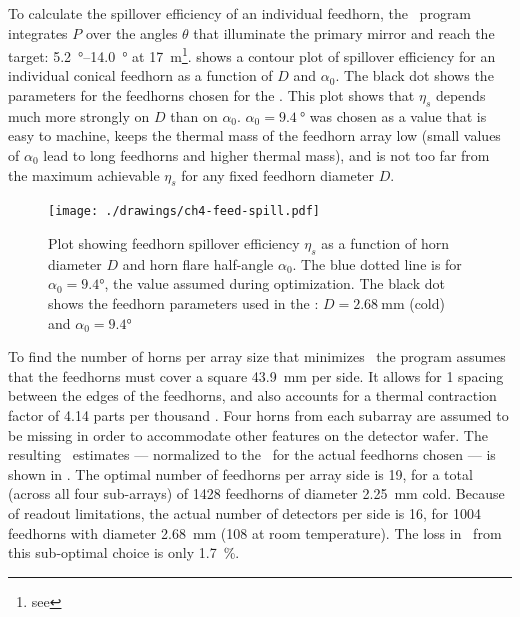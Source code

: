To calculate the spillover efficiency of an individual feedhorn, the \MATLAB\ program integrates $P$ over the angles $\theta$ that illuminate the primary mirror and reach the target: \SIrange{5.2}{14.0}{\degree} at \SI{17}{\m}\footnote{see }.
 shows a contour plot of spillover efficiency for an individual conical feedhorn as a function of $D$ and $\alpha_0$.
The black dot shows the parameters for the feedhorns chosen for the \Imager.
This plot shows that $\eta_s$ depends much more strongly on $D$ than on $\alpha_0$.
$\alpha_0 = \SI{9.4}{\degree}$ was chosen as a value that is easy to machine, keeps the thermal mass of the feedhorn array low (small values of $\alpha_0$ lead to long feedhorns and higher thermal mass), and is not too far from the maximum achievable $\eta_s$ for any fixed feedhorn diameter $D$.

\begin{figure}
\centering
\texttt{[image: ./drawings/ch4-feed-spill.pdf]}
\caption[Feedhorn spillover efficiency]{
  Plot showing feedhorn spillover efficiency $\eta_s$ as a function of horn diameter $D$ and horn flare half-angle $\alpha_0$.
  The blue dotted line is for $\alpha_0 = \ang{9.4}$, the value assumed during optimization.
  The black dot shows the feedhorn parameters used in the \Imager: $D = \SI{2.68}{\mm}$ (cold) and $\alpha_0 = \ang{9.4}$
}
\label{fig:ch4-feed-spill}
\end{figure}

To find the number of horns per array size that minimizes \NETD\, the program assumes that the feedhorns must cover a square \SI{43.9}{\mm} per side.
It allows for \SI{1}{\mil} spacing between the edges of the feedhorns, and also accounts for a thermal contraction factor of 4.14 parts per thousand \cite[Appendix~A6.4]{ekin_experimental_2006}.
Four horns from each subarray are assumed to be missing in order to accommodate other features on the detector wafer.
The resulting \NETD\ estimates --- normalized to the \NETD\ for the actual feedhorns chosen --- is shown in .
The optimal number of feedhorns per array side is 19, for a total (across all four sub-arrays) of 1428 feedhorns of diameter \SI{2.25}{\mm} cold.
Because of readout limitations, the actual number of detectors per side is 16, for 1004 feedhorns with diameter \SI{2.68}{\mm} (\SI{108}{\mils} at room temperature).
The loss in \NETD\ from this sub-optimal choice is only \SI{1.7}{\percent}.


